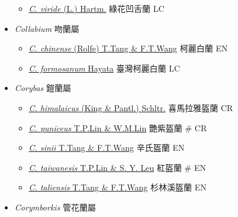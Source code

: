 \begin{itemize}
  \begin{itemize}
        \item[] \href{http://www.theplantlist.org/tpl1.1/search?q=Coeloglossum+viride}{\textit{C. viride} (L.) Hartm.}   綠花凹舌蘭   LC
  \end{itemize}
 \item[] \textit{Collabium} 吻蘭屬
                                
  \begin{itemize}
        \item[] \href{http://www.theplantlist.org/tpl1.1/search?q=Collabium+chinense}{\textit{C. chinense} (Rolfe) T.Tang \& F.T.Wang}   柯麗白蘭   EN
        \item[] \href{http://www.theplantlist.org/tpl1.1/search?q=Collabium+formosanum}{\textit{C. formosanum} Hayata}   臺灣柯麗白蘭   LC
  \end{itemize}
 \item[] \textit{Corybas} 鎧蘭屬
                                
  \begin{itemize}
        \item[] \href{http://www.theplantlist.org/tpl1.1/search?q=Corybas+himalaicus}{\textit{C. himalaicus} (King \& Pantl.) Schltr.}   喜馬拉雅盔蘭   CR
        \item[] \href{http://www.theplantlist.org/tpl1.1/search?q=Corybas+puniceus}{\textit{C. puniceus} T.P.Lin \& W.M.Lin}   艷紫盔蘭  \# CR
        \item[] \href{http://www.theplantlist.org/tpl1.1/search?q=Corybas+sinii}{\textit{C. sinii} T.Tang \& F.T.Wang}   辛氏盔蘭   EN
        \item[] \href{http://www.theplantlist.org/tpl1.1/search?q=Corybas+taiwanesis}{\textit{C. taiwanesis} T.P.Lin \& S. Y. Leu}   紅盔蘭  \# EN
        \item[] \href{http://www.theplantlist.org/tpl1.1/search?q=Corybas+taliensis}{\textit{C. taliensis} T.Tang \& F.T.Wang}   杉林溪盔蘭   EN
  \end{itemize}
 \item[] \textit{Corymborkis} 管花蘭屬
                                

\end{itemize}
